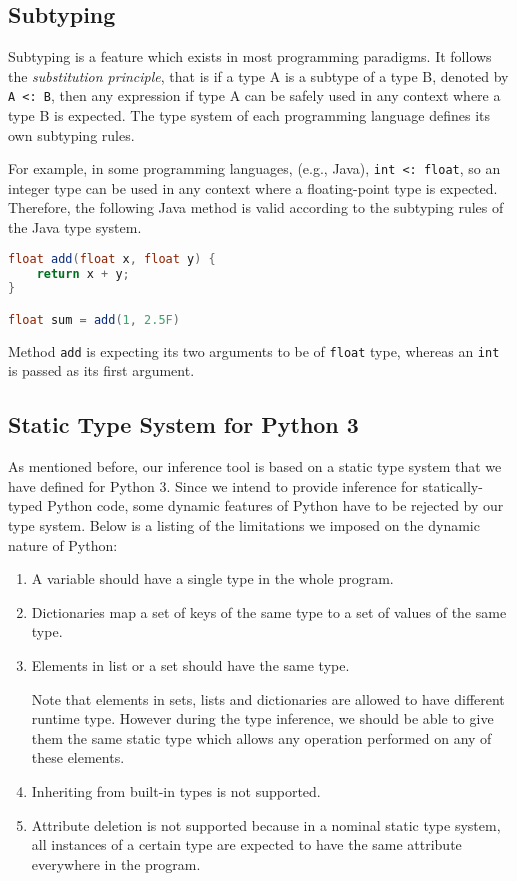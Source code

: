 \subsection{Subtyping}
Subtyping is a feature which exists in most programming paradigms. It follows the \textit{substitution principle}, that is if a type A is a subtype of a type B, denoted by \lstinline|A <: B|, then any expression if type A can be safely used in any context where a type B is expected. The type system of each programming language defines its own subtyping rules.

For example, in some programming languages, (e.g., Java), \lstinline|int <: float|, so an integer type can be used in any context where a floating-point type is expected. Therefore, the following Java method is valid according to the subtyping rules of the Java type system.

\begin{lstlisting}[language=java]
float add(float x, float y) {
	return x + y;
}

float sum = add(1, 2.5F)
\end{lstlisting}

Method \lstinline|add| is expecting its two arguments to be of \lstinline|float| type, whereas an \lstinline|int| is passed as its first argument.


\subsection{Static Type System for Python 3}\label{sub:st_ts_3}
As mentioned before, our inference tool is based on a static type system that we have defined for Python 3. Since we intend to provide inference for statically-typed Python code, some dynamic features of Python have to be rejected by our type system. Below is a listing of the limitations we imposed on the dynamic nature of Python:
\begin{enumerate}
	\item A variable should have a single type in the whole program.
	\item Dictionaries map a set of keys of the same type to a set of values of the same type.
	\item Elements in list or a set should have the same type.
	
	Note that elements in sets, lists and dictionaries are allowed to have different runtime type. However during the type inference, we should be able to give them the same static type which allows any operation performed on any of these elements.
	\item Inheriting from built-in types is not supported.
	\item Attribute deletion is not supported because in a nominal static type system, all instances of a certain type are expected to have the same attribute everywhere in the program.
\end{enumerate}

